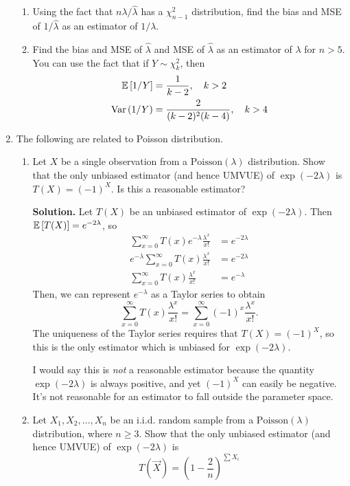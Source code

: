 \documentclass[titlepage]{article}
\begin{document}
\begin{enumerate}
\begin{enumerate}
  \item Using the fact that $n\lambda/\hat{\lambda}$ has a $\chi^2_{n-1}$ distribution, find the bias and MSE of $1/\hat{\lambda}$ as an estimator of $1/\lambda$.

  \item Find the bias and MSE of $\hat{\lambda}$ and MSE of $\hat{\lambda}$ as an estimator of $\lambda$ for $n > 5$. You can use the fact that if $Y \sim \chi^2_k$, then
  \[\begin{aligned}
  \mathbb{E}\left[ 1/Y \right] &= \frac{1}{k - 2}, \quad k > 2 \\
  \text{Var}\left( 1/Y \right) &= \frac{2}{(k-2)^2(k-4)}, \quad k > 4
  \end{aligned}\]
  \end{enumerate}

\item The following are related to Poisson distribution.
  \begin{enumerate}
  \item Let $X$ be a single observation from a $\text{Poisson}(\lambda)$ distribution. Show that the only unbiased estimator (and hence UMVUE) of $\exp(-2\lambda)$ is $T(X) = (-1)^X$. Is this a reasonable estimator?

  \textbf{Solution.} Let $T(X)$ be an unbiased estimator of $\exp(-2\lambda)$. Then $\mathbb{E}\left[ T(X) \right] = e^{-2\lambda}$, so
  \[\begin{aligned}
  \sum_{x=0}^\infty T(x)e^{-\lambda}\frac{\lambda^x}{x!} &= e^{-2\lambda}\\
  e^{-\lambda}\sum_{x=0}^\infty T(x)\frac{\lambda^x}{x!} &= e^{-2\lambda}\\
  \sum_{x=0}^\infty T(x)\frac{\lambda^x}{x!} &= e^{-\lambda}
  \end{aligned}\]
  Then, we can represent $e^{-\lambda}$ as a Taylor series to obtain
  \[\sum_{x=0}^\infty T(x)\frac{\lambda^x}{x!} = \sum_{x=0}^\infty (-1)^x\frac{\lambda^x}{x!}.\]
  The uniqueness of the Taylor series requires that $T(X) = (-1)^X$, so this is the only estimator which is unbiased for $\exp(-2\lambda)$.

  I would say this is \emph{not} a reasonable estimator because the quantity $\exp(-2\lambda)$ is always positive, and yet $(-1)^X$ can easily be negative. It's not reasonable for an estimator to fall outside the parameter space.

  \item Let $X_1, X_2, \ldots, X_n$ be an i.i.d. random sample from a $\text{Poisson}(\lambda)$ distribution, where $n \geq 3$. Show that the only unbiased estimator (and hence UMVUE) of $\exp(-2\lambda)$ is
    \[T(\vec{X}) = \left(1 - \frac{2}{n}\right)^{\sum X_i}\]
  \end{enumerate}


\end{enumerate}
\end{document}

